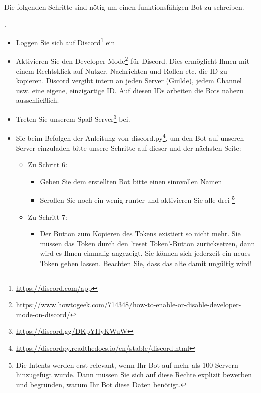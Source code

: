 \documentclass{ubo_tex_uebungszettel/uebungszettel}
\theoremstyle{definition}
\newcommand{\pp}[1]{\lpl{#1}}
\newcommand{\furl}[1]{\footnote{\url{#1}}}
\begin{document}
	\begin{aufg}[Vorbereitung]\quad
		
		\noindent Die folgenden Schritte sind nötig um einen funktionsfähigen Bot zu schreiben.
		
		\medskip
		
		\noindent{}.
		\begin{itemize}
			\item Loggen Sie sich auf Discord\furl{https://discord.com/app} ein
			
			\item Aktivieren Sie den Developer Mode\furl{https://www.howtogeek.com/714348/how-to-enable-or-disable-developer-mode-on-discord/} für Discord.
			Dies ermöglicht Ihnen mit einem Rechtsklick auf Nutzer, Nachrichten und Rollen etc. die ID zu kopieren.
			Discord vergibt intern an jeden Server (Guilde), jedem Channel usw. eine eigene, einzigartige ID. Auf diesen IDs arbeiten die Bots nahezu ausschließlich.
			
			\item Treten Sie unserem Spaß-Server\furl{https://discord.gg/DKpYHyKWuW} bei.
		\end{itemize}
		
		\pagebreak
		
		\noindent{}
		\begin{itemize}
			\item {} Sie beim Befolgen der Anleitung von discord.py\furl{https://discordpy.readthedocs.io/en/stable/discord.html}, um den Bot auf unseren Server einzuladen bitte unsere  Schritte auf dieser und der nächsten Seite:
			\begin{itemize}
				
				\item Zu Schritt 6:
				\begin{itemize}
					\item Geben Sie dem erstellten Bot bitte einen sinnvollen Namen
					\item Scrollen Sie noch ein wenig runter und aktivieren Sie alle drei \pp{Privileged Gateway Intents}\footnote{Die Intents werden erst relevant, wenn Ihr Bot auf mehr als 100 Servern hinzugefügt wurde. Dann müssen Sie sich auf diese Rechte explizit bewerben und begründen, warum Ihr Bot diese Daten benötigt.}
				\end{itemize}
				\item Zu Schritt 7:
				\begin{itemize}
					\item Der Button zum Kopieren des Tokens existiert so nicht mehr. Sie müssen das Token durch den 'reset Token'-Button zurücksetzen, dann wird es Ihnen einmalig angezeigt. Sie können sich jederzeit ein neues Token geben lassen. Beachten Sie, dass das alte damit ungültig wird!
				\end{itemize}
				

\end{itemize}
\end{itemize}
\end{aufg}
\end{document}
